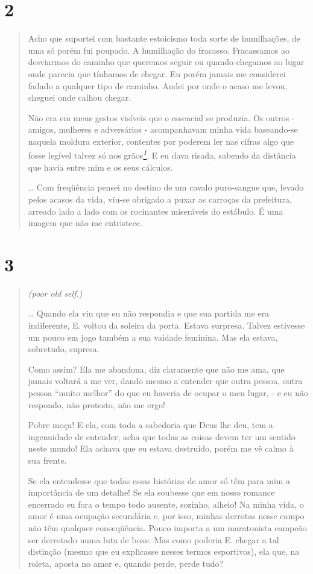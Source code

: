 \section{2}\label{section-1}

\begin{quote}
Acho que suportei com bastante estoicismo toda sorte de humilhações, de
uma só porém fui poupado. A humilhação do fracasso. Fracassamos ao
desviarmos do caminho que queremos seguir ou quando chegamos ao lugar
onde parecia que tínhamos de chegar. Eu porém jamais me considerei
fadado a qualquer tipo de caminho. Andei por onde o acaso me levou,
cheguei onde calhou chegar.

Não era em meus gestos visíveis que o essencial se produzia. Os outros -
amigos, mulheres e adversários - acompanhavam minha vida baseando-se
naquela moldura exterior, contentes por poderem ler nas cifras algo que
fosse legível talvez só nos
grãos\protect\hyperlink{_bookmark0}{\textsuperscript{\emph{1}}}. E eu
dava risada, sabendo da distância que havia entre mim e os seus
cálculos.

\ldots{} Com freqüência pensei no destino de um cavalo puro-sangue que,
levado pelos acasos da vida, viu-se obrigado a puxar as carroças da
prefeitura, arreado lado a lado com os rocinantes miseráveis do
estábulo. É uma imagem que não me entristece.
\end{quote}

\section{3}\label{section-2}

\begin{quote}
\emph{(poor old self.)}

\ldots{} Quando ela viu que eu não respondia e que sua partida me era
indiferente, E. voltou da soleira da porta. Estava surpresa. Talvez
estivesse um pouco em jogo também a sua vaidade feminina. Mas ela
estava, sobretudo, supresa.

Como assim? Ela me abandona, diz claramente que não me ama, que jamais
voltará a me ver, dando mesmo a entender que outra pessoa, outra pessoa
``muito melhor'' do que eu haveria de ocupar o meu lugar, - e eu não
respondo, não protesto, não me ergo!

Pobre moça! E ela, com toda a sabedoria que Deus lhe deu, tem a
ingenuidade de entender, acha que todas as coisas devem ter um sentido
neste mundo! Ela achava que eu estava destruído, porém me vê calmo à sua
frente.

Se ela entendesse que todas essas histórias de amor só têm para mim a
importância de um detalhe! Se ela soubesse que em nosso romance
encerrado eu fora o tempo todo ausente, sozinho, alheio! Na minha vida,
o amor é uma ocupação secundária e, por isso, minhas derrotas nesse
campo não têm qualquer conseqüência. Pouco importa a um maratonista
campeão ser derrotado numa luta de boxe. Mas como poderia E. chegar a
tal distinção (mesmo que eu explicasse nesses termos esportivos), ela
que, na roleta, aposta no amor e, quando perde, perde tudo?
\end{quote}

